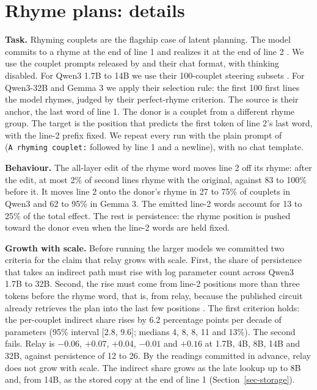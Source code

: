 \documentclass[
]{article}
\begin{document}
\section{Rhyme plans: details}\label{sec-app-couplets}

\textbf{Task.} Rhyming couplets are the flagship case of latent
planning. The model commits to a rhyme at the end of line 1 and realizes
it at the end of line 2 \citep{lindsey2025biology, hanna2026latent}. We
use the couplet prompts released by \citet{hanna2026latent} and their
chat format, with thinking disabled. For Qwen3 1.7B to 14B we use their
100-couplet steering subsets \citep{hanna2026planningdata}. For
Qwen3-32B and Gemma 3 we apply their selection rule: the first 100 first
lines the model rhymes, judged by their perfect-rhyme criterion. The
source is their anchor, the last word of line 1. The donor is a couplet
from a different rhyme group. The target is the position that predicts
the first token of line 2's last word, with the line-2 prefix fixed. We
repeat every run with the plain prompt of \citet{ma2026plan}
(\texttt{A\ rhyming\ couplet:} followed by line 1 and a newline), with
no chat template.

\textbf{Behaviour.} The all-layer edit of the rhyme word moves line 2
off its rhyme: after the edit, at most 2\% of second lines rhyme with
the original, against 83 to 100\% before it. It moves line 2 onto the
donor's rhyme in 27 to 75\% of couplets in Qwen3 and 62 to 95\% in Gemma
3. The emitted line-2 words account for 13 to 25\% of the total effect.
The rest is persistence: the rhyme position is pushed toward the donor
even when the line-2 words are held fixed.

\textbf{Growth with scale.} Before running the larger models we
committed two criteria for the claim that relay grows with scale. First,
the share of persistence that takes an indirect path must rise with log
parameter count across Qwen3 1.7B to 32B. Second, the rise must come
from line-2 positions more than three tokens before the rhyme word, that
is, from relay, because the published circuit already retrieves the plan
into the last few positions \citep{hanna2026latent}. The first criterion
holds: the per-couplet indirect share rises by 6.2 percentage points per
decade of parameters (95\% interval {[}2.8, 9.6{]}; medians 4, 8, 8, 11
and 13\%). The second fails. Relay is \(-0.06\), \(+0.07\), \(+0.04\),
\(-0.01\) and \(+0.16\) at 1.7B, 4B, 8B, 14B and 32B, against
persistence of 12 to 26. By the readings committed in advance, relay
does not grow with scale. The indirect share grows as the late lookup up
to 8B and, from 14B, as the stored copy at the end of line 1
(Section~\ref{sec-storage}).
\end{document}
